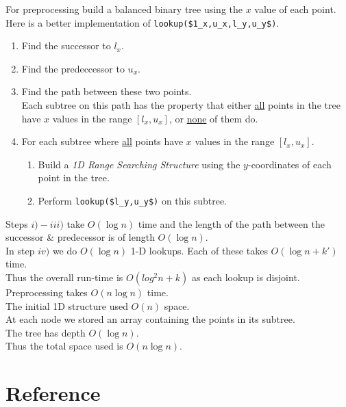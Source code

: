\documentclass[11pt,a4paper]{article}
\begin{document}
For preprocessing build a balanced binary tree using the $x$ value of each point.\\
Here is a better implementation of \lstinline!lookup($1_x,u_x,l_y,u_y$)!.
\begin{enumerate}
	\item Find the successor to $l_x$.
	\item Find the predeccessor to $u_x$.
	\item Find the path between these two points.\\
	Each subtree on this path has the property that either \underline{all} points in the tree have $x$ values in the range $[l_x,u_x]$, or \underline{none} of them do.
	\item For each subtree where \underline{all} points have $x$ values in the range $[l_x,u_x]$.
	\begin{enumerate}
		\item Build a \textit{1D Range Searching Structure} using the $y$-coordinates of each point in the tree.
		\item Perform \lstinline!lookup($l_y,u_y$)! on this subtree.
	\end{enumerate}
\end{enumerate}

Steps $i)-iii)$ take $O(\log n)$ time and the length of the path between the successor \& predecessor is of length $O(\log n)$.\\
In step $iv)$ we do $O(\log n)$ 1-D lookups. Each of these takes $O(\log n+k')$ time.\\
Thus the overall run-time is $O(log^2n+k)$ as each lookup is disjoint.\\
\nb Preprocessing takes $O(n\log n)$ time.\\

The initial 1D structure used $O(n)$ space.\\
At each node we stored an array containing the points in its subtree.\\
The tree has depth $O(\log n)$.\\
Thus the total space used is $O(n\log n)$.

\newpage
\setcounter{section}{-1}
\section{Reference}
\end{document}
